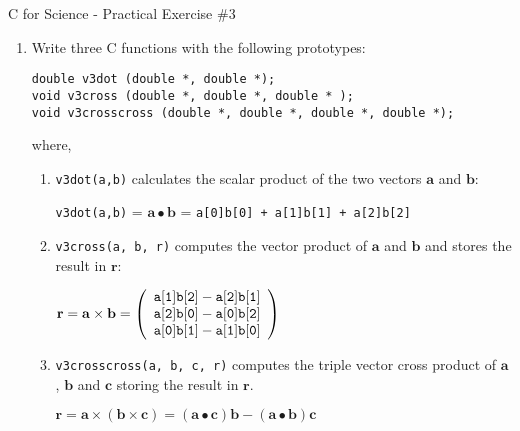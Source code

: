 \documentclass[a4paper,12pt]{article}
\begin{document}
\begin{center}
\large C for Science - Practical Exercise \#3
\end{center}
\begin{enumerate}
\item Write three C functions with the following prototypes:
\begin{verbatim}
double v3dot (double *, double *);
void v3cross (double *, double *, double * );
void v3crosscross (double *, double *, double *, double *);
\end{verbatim}
where,
\begin{enumerate}
\item \verb|v3dot(a,b)| calculates the scalar product of the two vectors $\mathbf{a}$ and $\mathbf{b}$:
\begin{center}
{\tt v3dot(a,b)} = $\mathbf{a}\bullet\mathbf{b}$ = {\tt a[0]b[0] + a[1]b[1] + a[2]b[2]}
\end{center}
\item \verb|v3cross(a, b, r)| computes the vector product of $\mathbf{a}$ and $\mathbf{b}$ and stores the result in $\mathbf{r}$:
\begin{center}
$\mathbf{r} = \mathbf{a}\times\mathbf{b} =
\left(\begin{array}{c}
{\tt a[1]b[2] - a[2]b[1]}\\
{\tt a[2]b[0] - a[0]b[2]}\\
{\tt a[0]b[1] - a[1]b[0]}
\end{array}\right)$
\end{center}
\item \verb|v3crosscross(a, b, c, r)| computes the triple vector cross product of $\mathbf{a}$, $\mathbf{b}$ and $\mathbf{c}$ storing the result in
$\mathbf{r}$.
\begin{center}
$\mathbf{r} = \mathbf{a}\times(\mathbf{b}\times\mathbf{c}) = 
(\mathbf{a}\bullet\mathbf{c})\mathbf{b} - (\mathbf{a}\bullet\mathbf{b})\mathbf{c}$
\end{center}
\end{enumerate}


\end{enumerate}
\end{document}
